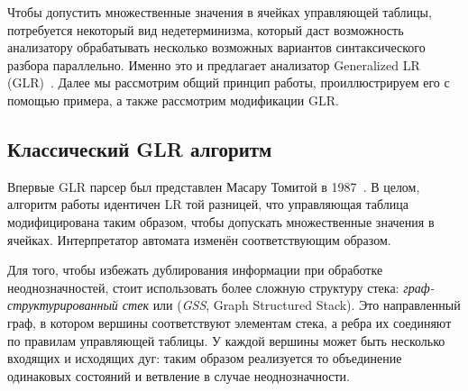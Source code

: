 Чтобы допустить множественные значения в ячейках управляющей таблицы, потребуется некоторый вид недетерминизма, который даст возможность анализатору обрабатывать несколько возможных вариантов синтаксического разбора параллельно. Именно это и предлагает анализатор Generalized LR (GLR)~\cite{tomita-1987-efficient}. Далее мы рассмотрим общий принцип работы, проиллюстрируем его с помощью примера, а также рассмотрим модификации GLR.

\subsection{Классический GLR алгоритм}

Впервые GLR парсер был представлен Масару Томитой в 1987~\cite{tomita-1987-efficient}. В целом, алгоритм работы идентичен LR той разницей, что управляющая таблица модифицирована таким образом, чтобы допускать множественные значения в ячейках. Интерпретатор автомата изменён соответствующим образом.

Для того, чтобы избежать дублирования информации при обработке неоднозначностей, стоит использовать более сложную структуру стека: \textit{граф-структурированный стек} или (\textit{GSS}, Graph Structured Stack). Это направленный граф, в котором вершины соответствуют элементам стека, а ребра их соединяют по правилам управляющей таблицы. У каждой вершины может быть несколько входящих и исходящих дуг: таким образом реализуется то объединение одинаковых состояний и ветвление в случае неоднозначности.

